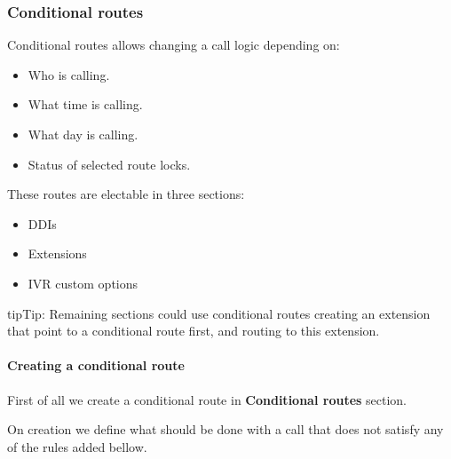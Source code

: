 \documentclass[letterpaper,10pt,english]{sphinxmanual}
\begin{document}
\subsubsection{Conditional routes}
\label{administration_portal/client/vpbx/routing_endpoints/conditional_routes:id2}\label{administration_portal/client/vpbx/routing_endpoints/conditional_routes::doc}\label{administration_portal/client/vpbx/routing_endpoints/conditional_routes:conditional-routes}\label{administration_portal/client/vpbx/routing_endpoints/conditional_routes:id1}
Conditional routes allows changing a call logic depending on:
\begin{itemize}
\item {} 
Who is calling.

\item {} 
What time is calling.

\item {} 
What day is calling.

\item {} 
Status of selected route locks.

\end{itemize}

These routes are electable in three sections:
\begin{itemize}
\item {} 
DDIs

\item {} 
Extensions

\item {} 
IVR custom options

\end{itemize}

\begin{notice}{tip}{Tip:}
Remaining sections could use conditional routes creating an extension
that point to a conditional route first, and routing to this extension.
\end{notice}


\paragraph{Creating a conditional route}
\label{administration_portal/client/vpbx/routing_endpoints/conditional_routes:creating-a-conditional-route}
First of all we create a conditional route in \textbf{Conditional routes} section.

On creation we define what should be done with a call that does not satisfy any
of the rules added bellow.
\end{document}
